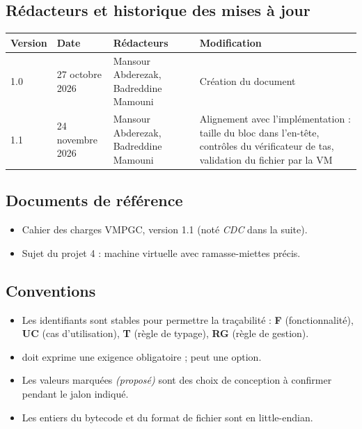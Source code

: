 \documentclass[11pt,a4paper]{article}
\newcommand{\code}[1]{\texttt{\detokenize{#1}}}
\begin{document}
\subsection{Rédacteurs et historique des mises à jour}

\begin{longtable}{@{}p{} p{} p{} p{}@{}}
\toprule
\textbf{Version} & \textbf{Date} & \textbf{Rédacteurs} & \textbf{Modification} \\
\midrule
\endhead
1.0 & 27 octobre 2026 & Mansour Abderezak, Badreddine Mamouni & Création du document \\
1.1 & 24 novembre 2026 & Mansour Abderezak, Badreddine Mamouni & Alignement avec l'implémentation : taille du bloc dans l'en-tête, contrôles du vérificateur de tas, validation du fichier \code{.tbc} par la VM \\
\bottomrule
\end{longtable}

\subsection{Documents de référence}
\begin{itemize}
  \item Cahier des charges VMPGC, version 1.1 (noté \emph{CDC} dans la suite).
  \item Sujet du projet 4 : machine virtuelle avec ramasse-miettes précis.
\end{itemize}

\subsection{Conventions}
\begin{itemize}
  \item Les identifiants sont stables pour permettre la traçabilité : \textbf{F} (fonctionnalité), \textbf{UC} (cas d'utilisation), \textbf{T} (règle de typage), \textbf{RG} (règle de gestion).
  \item \og doit \fg{} exprime une exigence obligatoire ; \og peut \fg{} une option.
  \item Les valeurs marquées \emph{(proposé)} sont des choix de conception à confirmer pendant le jalon indiqué.
  \item Les entiers du bytecode et du format de fichier sont en little-endian.
\end{itemize}

\end{document}
